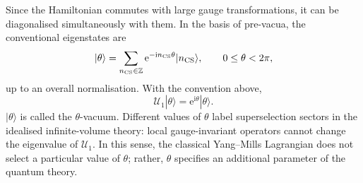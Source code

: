 \documentclass[review]{elsarticle}
\numberwithin{equation}{section}
\numberwithin{table}{section}
\numberwithin{figure}{section}
\def\i{\mathrm{i}}
\def\e{\mathrm{e}}
\begin{document}
Since the Hamiltonian commutes with large gauge transformations, it can be diagonalised simultaneously with them. In the basis of pre-vacua, the conventional eigenstates are
\begin{equation}
    |\theta\rangle = \sum_{n_{\rm CS}\in\mathbb{Z}}\e^{-\i n_{\rm CS}\theta}|n_{\rm CS}\rangle,
    \qquad 
    0\leq\theta<2\pi,
    \label{eq:theta-vacuum}
\end{equation}
up to an overall normalisation. With the convention above,
\begin{equation}
    \mathcal{U}_1|\theta\rangle = \e^{\i\theta}|\theta\rangle .
\end{equation}
$|\theta\rangle$ is called the $\theta$-vacuum. Different values of $\theta$ label superselection sectors in the idealised infinite-volume theory: local gauge-invariant operators cannot change the eigenvalue of $\mathcal{U}_1$. In this sense, the classical Yang--Mills Lagrangian does not select a particular value of $\theta$; rather, $\theta$ specifies an additional parameter of the quantum theory.
\end{document}
